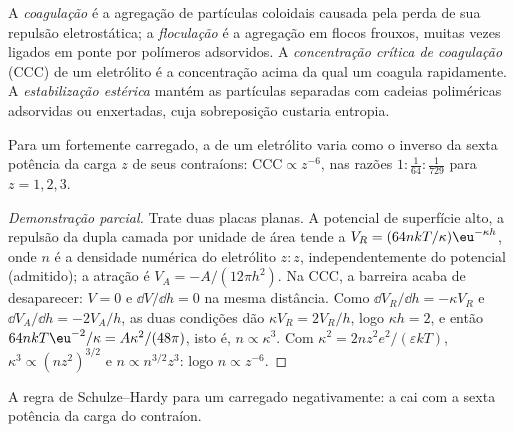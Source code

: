 \begin{definition}\label{def:b3:colloids:stability}
A \emph{coagulação} é a agregação de partículas coloidais
causada pela perda de sua repulsão eletrostática; a \emph{floculação}
é a agregação em flocos frouxos, muitas vezes ligados em ponte por polímeros adsorvidos.
A \emph{concentração crítica de coagulação}
(CCC) de um eletrólito é a concentração acima da qual um  coagula
rapidamente. A \emph{estabilização estérica}
mantém as partículas separadas com cadeias poliméricas adsorvidas ou enxertadas,
cuja sobreposição custaria entropia.
\end{definition}

\begin{proposition}\label{prop:b3:colloids:schulze-hardy}
Para um  fortemente carregado, a  de um
eletrólito varia como o inverso da sexta potência da carga $z$ de seus contraíons:
$\text{CCC} \propto z^{-6}$, nas razões $1 : \frac{1}{64} : \frac{1}{729}$ para $z = 1, 2, 3$.
\end{proposition}

\begin{proof}[Demonstração parcial]
Trate duas placas planas. A potencial de superfície alto, a repulsão da dupla camada
por unidade de área tende a $V_R = (64nkT/\kappa)\eu^{-\kappa h}$, onde $n$ é a densidade numérica do eletrólito
$z{:}z$, independentemente do potencial (admitido); a atração é $V_A =
-A/(12\pi h^2)$. Na CCC, a barreira acaba de desaparecer: $V = 0$ e $\dd V/\dd h = 0$ na mesma
distância. Como $\dd V_R/\dd h = -\kappa V_R$ e $\dd V_A/\dd h = -2V_A/h$, as duas condições dão
$\kappa V_R = 2V_R/h$, logo $\kappa h = 2$, e então $64nkT\eu^{-2}/\kappa = A\kappa^2/(48\pi)$, isto é, $n \propto \kappa^3$. Com
$\kappa^2 = 2nz^2e^2/(\varepsilon kT)$, $\kappa^3 \propto (nz^2)^{3/2}$ e $n \propto n^{3/2}z^3$: logo $n \propto z^{-6}$.
\end{proof}

\begin{omfigure}

{\small A regra de Schulze--Hardy para um  carregado negativamente: a
 cai com a sexta potência da carga do contraíon.}
\end{omfigure}


